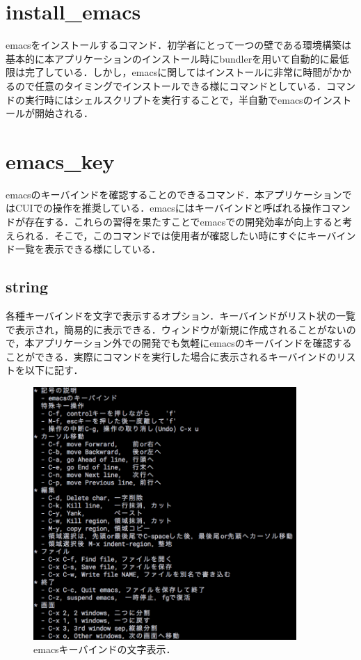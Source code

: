 \section{install\_emacs}\label{install_emacs}
emacsをインストールするコマンド．初学者にとって一つの壁である環境構築は基本的に本アプリケーションのインストール時にbundlerを用いて自動的に最低限は完了している．しかし，emacsに関してはインストールに非常に時間がかかるので任意のタイミングでインストールできる様にコマンドとしている．コマンドの実行時にはシェルスクリプトを実行することで，半自動でemacsのインストールが開始される．

\section{emacs\_key}\label{emacs_key}
emacsのキーバインド\cite{keybind}を確認することのできるコマンド．本アプリケーションではCUIでの操作を推奨している．emacsにはキーバインドと呼ばれる操作コマンドが存在する．これらの習得を果たすことでemacsでの開発効率が向上すると考えられる．そこで，このコマンドでは使用者が確認したい時にすぐにキーバインド一覧を表示できる様にしている．

\subsection{string}\label{string}
各種キーバインドを文字で表示するオプション．キーバインドがリスト状の一覧で表示され，簡易的に表示できる．ウィンドウが新規に作成されることがないので，本アプリケーション外での開発でも気軽にemacsのキーバインドを確認することができる．実際にコマンドを実行した場合に表示されるキーバインドのリストを以下に記す．
\begin{figure}[H]
\centering
\begin{center}
\includegraphics[width=100mm]{../../picture/keybind_string.png}
\end{center}
\caption{emacsキーバインドの文字表示．\label{keybind_string}}
\end{figure}

